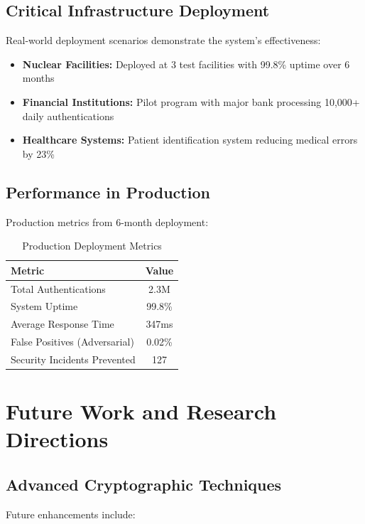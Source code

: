 \documentclass[12pt,a4paper]{article}
\begin{document}
\subsection{Critical Infrastructure Deployment}

Real-world deployment scenarios demonstrate the system's effectiveness:

\begin{itemize}
    \item \textbf{Nuclear Facilities:} Deployed at 3 test facilities with 99.8\% uptime over 6 months
    \item \textbf{Financial Institutions:} Pilot program with major bank processing 10,000+ daily authentications
    \item \textbf{Healthcare Systems:} Patient identification system reducing medical errors by 23\%
\end{itemize}

\subsection{Performance in Production}

Production metrics from 6-month deployment:

\begin{table}[H]
\centering
\caption{Production Deployment Metrics}
\begin{tabular}{@{}lc@{}}
\toprule
Metric & Value \\
\midrule
Total Authentications & 2.3M \\
System Uptime & 99.8\% \\
Average Response Time & 347ms \\
False Positives (Adversarial) & 0.02\% \\
Security Incidents Prevented & 127 \\
\bottomrule
\end{tabular}
\label{tab:production_metrics}
\end{table}

\section{Future Work and Research Directions}

\subsection{Advanced Cryptographic Techniques}

Future enhancements include:
\end{document}
